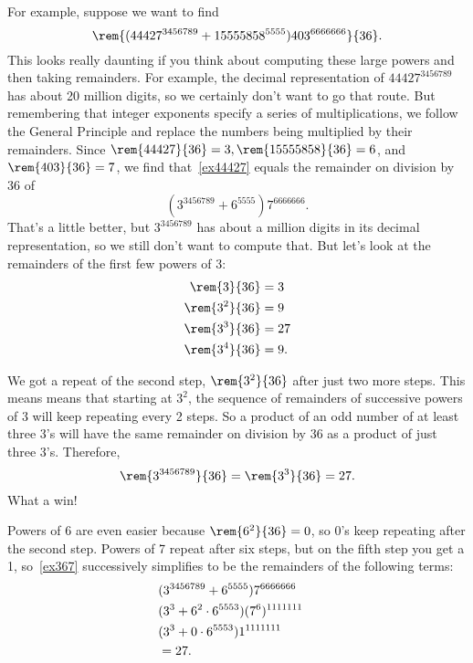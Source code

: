 For example, suppose we want to find
\begin{equation}\label{ex44427}
\rem{(44427^{3456789} + 15555858^{5555})403^{6666666}}{36}.
\end{equation}
This looks really daunting if you think about computing these large
powers and then taking remainders.  For example, the decimal
representation of $44427^{3456789}$ has about 20 million digits, so we
certainly don't want to go that route.  But remembering that integer
exponents specify a series of multiplications, we follow the General
Principle and replace the numbers being multiplied by their
remainders.  Since $\rem{44427}{36} = 3, \rem{15555858}{36} = 6$, and
$\rem{403}{36} = 7$, we find that~\eqref{ex44427} equals the remainder
on division by 36 of
\begin{equation}\label{ex367}
(3^{3456789} + 6^{5555})7^{6666666}.
\end{equation}
That's a little better, but $3^{3456789}$ has about a million digits
in its decimal representation, so we still don't want to compute that.
But let's look at the remainders of the first few powers of 3:
\begin{align*}
\rem{3}{36} & = 3\\
\rem{3^2}{36} & = 9\\
\rem{3^3}{36} & = 27\\
\rem{3^4}{36} & = 9.
\end{align*}

We got a repeat of the second step, $\rem{3^2}{36}$ after just two
more steps.  This means means that starting at $3^2$, the sequence of
remainders of successive powers of 3 will keep repeating every 2
steps.  So a product of an odd number of at least three 3's will have
the same remainder on division by 36 as a product of just three 3's.
Therefore,
\[
\rem{3^{3456789}}{36} = \rem{3^3}{36} = 27.
\]
What a win!

Powers of 6 are even easier because $\rem{6^2}{36} = 0$, so 0's keep
repeating after the second step.  Powers of 7 repeat after six steps,
but on the fifth step you get a 1, so~\eqref{ex367} successively
simplifies to be the remainders of the following terms:
\begin{align*}
\lefteqn{(3^{3456789} + 6^{5555})7^{6666666}}\\
   & (3^3 + 6^2 \cdot 6^{5553})(7^6)^{1111111}\\
   & (3^3 + 0 \cdot 6^{5553})1^{1111111}\\
   & = 27.
\end{align*}

